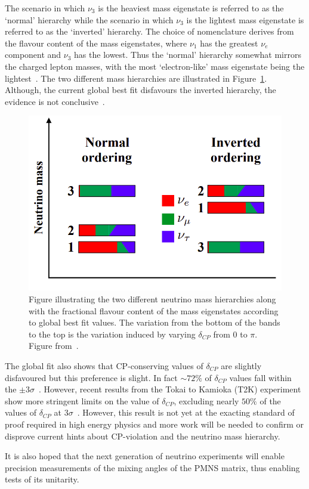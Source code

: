 The scenario in which $\nu_{3}$ is the heaviest mass eigenstate is referred to as the `normal' hierarchy while the scenario in which $\nu_{3}$ is the lightest mass eigenstate is referred to as the `inverted' hierarchy.
The choice of nomenclature derives from the flavour content of the mass eigenstates, where $\nu_{1}$ has the greatest $\nu_{e}$ component and $\nu_{3}$ has the lowest.
Thus the `normal' hierarchy somewhat mirrors the charged lepton masses, with the most `electron-like' mass eigenstate being the lightest~\cite{massHierarchy}.
The two different mass hierarchies are illustrated in Figure~\ref{fig:massHierarchy}.
Although, the current global best fit disfavours the inverted hierarchy, the evidence is not conclusive~\cite{nufit4}. 
\begin{figure}[h]
  \centering
  \includegraphics[width=.7\linewidth]{files/figures/historical_context/mh}
  \caption{Figure illustrating the two different neutrino mass hierarchies along with the fractional flavour content of the mass eigenstates according to global best fit values. The variation from the bottom of the bands to the top is the variation induced by varying $\delta_{CP}$ from 0 to $\pi$. Figure from~\cite{tdrVol2}.}
  \label{fig:massHierarchy}
\end{figure}

The global fit also shows that CP-conserving values of $\delta_{CP}$ are slightly disfavoured but this preference is slight.
In fact $\sim72\%$ of $\delta_{CP}$ values fall within the $\pm3\sigma$~\cite{nufit4}.
However, recent results from the Tokai to Kamioka (T2K) experiment show more stringent limits on the value of $\delta_{CP}$, excluding nearly $50\%$ of the values of $\delta_{CP}$ at $3\sigma$~\cite{t2kRecent}.
However, this result is not yet at the exacting standard of proof required in high energy physics and more work will be needed to confirm or disprove current hints about CP-violation and the neutrino mass hierarchy.

It is also hoped that the next generation of neutrino experiments will enable precision measurements of the mixing angles of the PMNS matrix, thus enabling tests of its unitarity.



